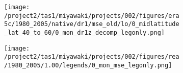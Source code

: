 \documentclass{beamer}
\begin{document}
{\begin{figure}
        \begin{subfigure}[t]{0.05\textwidth}
        \end{subfigure}
        \begin{subfigure}[t]{0.43\textwidth}
            \texttt{[image: /project2/tas1/miyawaki/projects/002/figures/era5c/1980\_2005/native/dr1/mse\_old/lo/0\_midlatitude\_lat\_40\_to\_60/0\_mon\_dr1z\_decomp\_legonly.png]}
        \end{subfigure}
        \begin{subfigure}[t]{0.05\textwidth}
            \hfill
        \end{subfigure}
        \begin{subfigure}[t]{0.40\textwidth}
            \texttt{[image: /project2/tas1/miyawaki/projects/002/figures/rea/1980\_2005/1.00/legends/0\_mon\_mse\_legonly.png]}
        \end{subfigure}
    \end{figure}
}
\end{document}
